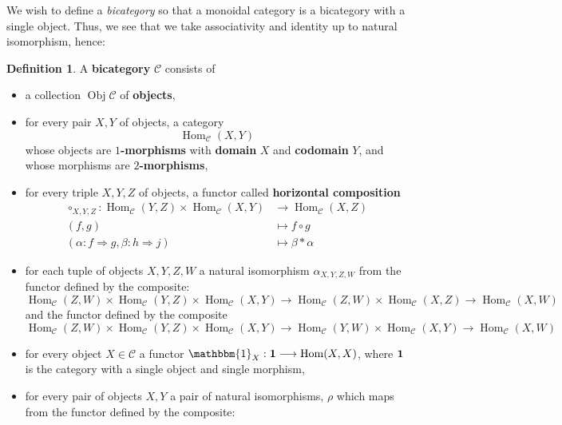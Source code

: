 \documentclass[12pt]{article}
\theoremstyle{plain}
\theoremstyle{definition}
\newtheorem{defn}[thm]{Definition} %
\newcommand{\scr}[1]{\mathscr{#1}}
\newcommand{\lto}{\longrightarrow}
\begin{document}
We wish to define a \emph{bicategory} so that a monoidal category is a bicategory with a single object. Thus, we see that we take associativity and identity up to natural isomorphism, hence:
\begin{defn}
A \textbf{bicategory} $\scr{C}$ consists of
\begin{itemize}
\item a collection $\operatorname{Obj}\scr{C}$ of \textbf{objects},
\item for every pair $X,Y$ of objects, a category
\begin{equation}
\operatorname{Hom}_{\scr{C}}(X,Y)
\end{equation}
whose objects are \textbf{$1$-morphisms} with \textbf{domain} $X$ and \textbf{codomain} $Y$, and whose morphisms are \textbf{$2$-morphisms},
\item for every triple $X,Y,Z$ of objects, a functor called \textbf{horizontal composition}
\begin{align*}
\circ_{X,Y,Z}: \operatorname{Hom}_{\scr{C}}(Y,Z) \times \operatorname{Hom}_{\scr{C}}(X,Y) &\lto \operatorname{Hom}_{\scr{C}}(X,Z)\\
(f,g) &\longmapsto f \circ g\\
(\alpha: f \Rightarrow g, \beta: h \Rightarrow j) &\longmapsto \beta \ast \alpha
\end{align*}
\item for each tuple of objects $X,Y,Z,W$ a natural isomorphism $\alpha_{X,Y,Z,W}$ from the functor defined by the composite:
\begin{equation}
\operatorname{Hom}_{\scr{C}}(Z,W) \times \operatorname{Hom}_{\scr{C}}(Y,Z) \times \operatorname{Hom}_{\scr{C}}(X,Y) \lto \operatorname{Hom}_{\scr{C}}(Z,W) \times \operatorname{Hom}_{\scr{C}}(X,Z) \lto \operatorname{Hom}_{\scr{C}}(X,W)
\end{equation}
and the functor defined by the composite
\begin{equation}
\operatorname{Hom}_{\scr{C}}(Z,W) \times \operatorname{Hom}_{\scr{C}}(Y,Z) \times \operatorname{Hom}_{\scr{C}}(X,Y) \lto \operatorname{Hom}_{\scr{C}}(Y,W) \times \operatorname{Hom}_{\scr{C}}(X,Y) \lto \operatorname{Hom}_{\scr{C}}(X,W)
\end{equation}
\item for every object $X \in \scr{C}$ a functor $\mathbbm{1}_X: \bold{1} \lto \operatorname{Hom}(X,X)$, where $\bold{1}$ is the category with a single object and single morphism,
\item for every pair of objects $X,Y$ a pair of natural isomorphisms, $\rho$ which maps from the functor defined by the composite:

\end{itemize}
\end{defn}
\end{document}
